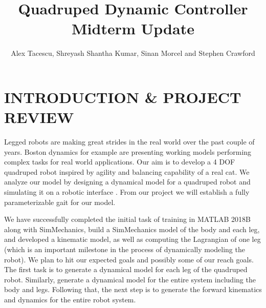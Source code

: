 \documentclass[letterpaper, 10 pt, conference]{ieeeconf}  %
\title{\LARGE \bf
Quadruped Dynamic Controller Midterm Update
}
\author{Alex Tacescu, Shreyash Shantha Kumar, Sinan Morcel and Stephen Crawford}
\begin{document}
\maketitle
\thispagestyle{empty}
\pagestyle{empty}






\section{INTRODUCTION \& PROJECT REVIEW}
Legged robots are making great strides in the real world over the past couple of years. Boston dynamics for example are presenting working models performing complex tasks for real world applications. Our aim is to develop a 4 DOF quadruped robot inspired by agility and balancing capability of a real cat. We analyze our model by designing a dynamical model for a quadruped robot and simulating it on a robotic interface . From our project we will establish a fully parameterizable gait for our model. 

We have successfully completed the initial task of training in MATLAB 2018B along with SimMechanics, build a SimMechanics model of the body and each leg, and developed a kinematic model, as well as computing the Lagrangian of one leg (which is an important milestone in the process of dynamically modeling the robot). We plan to hit our expected goals and possibly some of our reach goals. The first task is to generate a dynamical model for each leg of the quadruped robot. Similarly, generate a dynamical model for the entire system including the body and legs. Following that, the next step is  to generate the forward kinematics and dynamics for the entire robot system.
\end{document}
